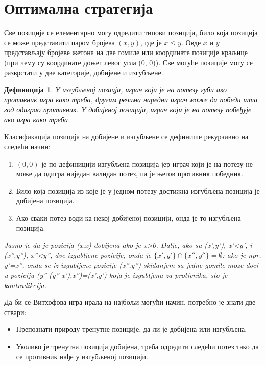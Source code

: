 \documentclass[a4paper]{article}
\newtheorem{definition}{Дефиниција}
\begin{document}
\section{Оптимална стратегија}
\label{sec:optimalna_strategija}

Све позиције се елементарно могу одредити типови позиција, било која позиција се може представити паром бројева $ (x, y) $, где је $ x \le  y $. Овде  $ x $ и $ y $ представљају бројеве жетона на две гомиле или координате позиције краљице (при чему су координате доњег левог угла (0, 0)). Све могуће позиције могу се разврстати у две категорије, добијене и изгубљене. 

\begin{definition}
	У изгубљеној позицји, играч који је на потезу губи ако противник игра како треба, другим речима наредни играч може да победи шта год одиграо противник. У добијеној позицији, играч који је на потезу побеђује ако игра како треба.
\end{definition}

Класификација позиција на добијене и изгубљене се дефинише рекурзивно на следећи начин:
\begin{enumerate}
	\item $ (0, 0) $ је по дефиницији изгубљена позиција јер играч који је на потезу не може да одигра ниједан валидан потез, па је његов противник победник.
	\item Било која позиција из које је у једном потезу достижна изгубљена позиција је добијена позиција.
	\item Ако сваки потез води ка некој добијеној позицији, онда је то изгубљена позиција.
\end{enumerate}

\textit{Jasno je da je pozicija (x,x) dobijena ako je x>0. Dalje,  ako su (x',y'), x'<y', i (x'',y''), x''<y'', dve izgubljene pozicije, onda je $\{x',y'\} \cap   \{x'',y''\}= \emptyset $:
ako je npr. y'=x'', onda se iz izgubljene pozicije (x'',y'') skidanjem sa jedne gomile moze doci u poziciju
(y''-(y''-x'),x'')=(x',y') koja je izgubljena za protivnika, sto je kontradikcija.}

Да би се Витхофова игра ирала на најбољи могући начин, потребно је знати две ствари:
\begin{itemize}
	\item Препознати природу тренутне позиције, да ли је добијена или изгубљена.
	\item Уколико је тренутна позиција добијена, треба одредити следећи потез тако да се противник нађе у изгубљеној позицији.
\end{itemize}
\end{document}
